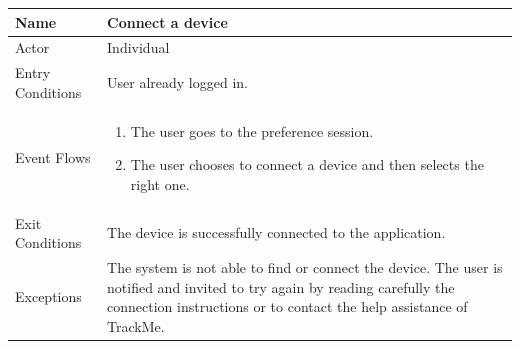 \documentclass{article}
\begin{document}
\begin{legal}
\begin{legal}
\begin{legal}
					\begin{tabular}{| m{3.5cm} | m{8cm}| }
				\hline
					Name & Connect a device\\
				\hline
					Actor & Individual\\
				\hline
					Entry Conditions & User already logged in.\\
				\hline
					Event Flows & \begin{enumerate}
									\item The user goes to the preference session.
									\item The user chooses to connect a device and then selects the right one.
				\end{enumerate}\\
				\hline
					Exit Conditions & The device is successfully connected to the application.\\
				\hline
					Exceptions & The system is not able to find or connect the device. The user is notified and invited to try again by reading carefully the connection instructions or to contact the help assistance of TrackMe.\\
				\hline
				\end{tabular}
				\\\\\\
    		\end{legal}
		\end{legal}
	
	\end{legal}
\end{document}
